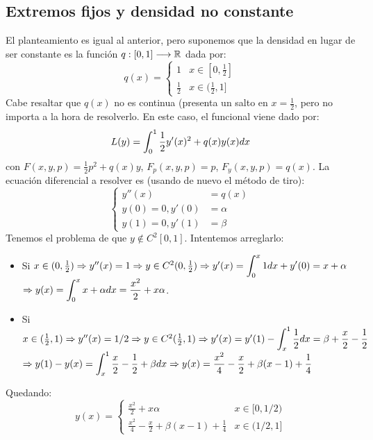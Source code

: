 \subsection{Extremos fijos y densidad no constante}

El planteamiento es igual al anterior, pero suponemos que la densidad en lugar de ser constante es la función $q : [0,1] \longrightarrow \mathbb{R}$ dada por:
\[
q(x)=\left\{\begin{array}{cc}
1 & x \in[0,\frac{1}{2}] \\
\frac{1}{2} & x \in(\frac{1}{2}, 1] 
\end{array}
\right.
\]
Cabe resaltar que $q(x)$ no es continua (presenta un salto en $x=\frac{1}{2}$, pero no importa a la hora de resolverlo. En este caso, el funcional viene dado por:
\[
L(y)=\displaystyle\int_{ 0 }^{ 1 } \frac{1}{2}y'(x)^2+q(x)y(x)dx
\]
con $F(x,y,p)=\frac{1}{2}p^2+q(x)y$, $F_p(x,y,p)=p$, $F_y(x,y,p)=q(x)$. La ecuación diferencial a resolver es (usando de nuevo el método de tiro):
\[
\left\{
\begin{array}{rl}
y''(x) & = q(x) \\
y(0)  = 0,y'(0) & = \alpha \\
y(1)= 0, y'(1) & = \beta
\end{array}
\right.
\]
Tenemos el problema de que $y\notin C^2[0,1]$. Intentemos arreglarlo:
\begin{itemize}
\item Si $x\in(0,\frac{1}{2}) \Rightarrow y''(x)=1 \Rightarrow y\in C^2(0,\frac{1}{2}) \Rightarrow y'(x)=\displaystyle\int_{ 0 }^{ x } 1dx+y'(0)=x+\alpha$\\
 $\Rightarrow y(x)=\displaystyle\int_{ 0 }^{ x } x+\alpha dx=\frac{x^2}{2}+x\alpha$.
\item Si $x\in(\frac{1}{2},1) \Rightarrow y''(x)=1/2 \Rightarrow y\in C^2(\frac{1}{2},1) \Rightarrow y'(x)=y'(1)-\displaystyle\int_{ x }^{ 1 } \frac{1}{2}dx=\beta+\frac{x}{2}-\frac{1}{2}$\\
$\Rightarrow y(1)-y(x)=\displaystyle\int_{ x }^{ 1 } \frac{x}{2}-\frac{1}{2}+\beta dx\Rightarrow y(x)=\frac{x^2}{4}-\frac{x}{2}+\beta(x-1)+\frac{1}{4}$
\end{itemize}
Quedando:
\begin{equation}\label{y}
y(x)=\left\{
\begin{array}{cc}
\frac{x^2}{2}+x\alpha & x\in[0,1/2) \\
\frac{x^2}{4}-\frac{x}{2}+\beta(x-1)+\frac{1}{4} & x\in(1/2,1]
\end{array}
\right.
\end{equation}

